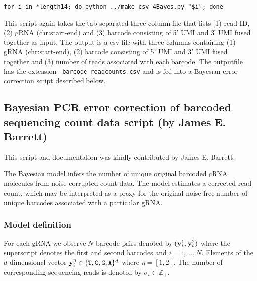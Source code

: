 \begin{small}\begin{lstlisting}
for i in *length14; do python ../make_csv_4Bayes.py "$i"; done
\end{lstlisting}\end{small}

This script again takes the tab-separated three column file that lists (1) read ID, (2) gRNA (chr:start-end) and (3) barcode consisting of 5' UMI and 3' UMI fused together as input. The output is a csv file with three columns containing (1) gRNA (chr:start-end), (2) barcode consisting of 5' UMI and 3' UMI fused together and (3) number of reads associated with each barcode. The outputfile has the extension \verb|_barcode_readcounts.csv| and is  fed into a Bayesian error correction script described below.

\subsection{Bayesian PCR error correction of barcoded sequencing count data script (by James E. Barrett)}

This script and documentation was kindly contributed by James E. Barrett. 

The Bayesian model infers the number of unique original barcoded gRNA molecules from noise-corrupted count data. The model estimates a corrected read count, which may be interpreted as a proxy for the original noise-free number of unique barcodes associated with a particular gRNA. 

\subsubsection{Model definition}
For each gRNA we observe $N$ barcode pairs denoted by $(\boldsymbol{\mathbf{y}}_{i}^1,\boldsymbol{\mathbf{y}}_{i}^2)$ where the superscript denotes the first and second barcodes and $i=1,\ldots,N$. Elements of the $d$-dimensional vector $\vecy_{i}^{\eta}\in\{\verb+T+,\verb+C+,\verb+G+,\verb+A+\}^d$ where $\eta=[1,2]$. The number of corresponding sequencing reads is denoted by $\sigma_{i}\in\mathbb{Z}_+$. 

